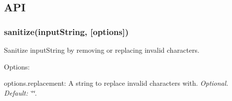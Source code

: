 \subsection*{A\+PI}

\subsubsection*{{\ttfamily sanitize(input\+String, \mbox{[}options\mbox{]})}}

Sanitize {\ttfamily input\+String} by removing or replacing invalid characters.

Options\+:


\begin{DoxyItemize}
\item {\ttfamily options.\+replacement}\+: A string to replace invalid characters with. {\itshape Optional. Default\+: {\ttfamily \char`\"{}\char`\"{}}.} 
\end{DoxyItemize}